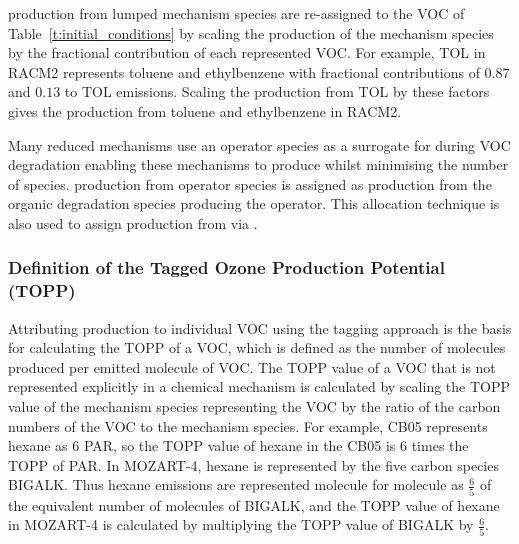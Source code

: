  production from lumped mechanism species are re-assigned to the VOC of \mbox{Table \ref{t:initial_conditions}} by scaling the  production of the mechanism species by the fractional contribution of each represented VOC.
For example, TOL in RACM2 represents toluene and ethylbenzene with fractional contributions of $0.87$ and $0.13$ to TOL emissions.
Scaling the  production from TOL by these factors gives the  production from toluene and ethylbenzene in RACM2.

Many reduced mechanisms use an operator species as a surrogate for  during VOC degradation enabling these mechanisms to produce  whilst minimising the number of  species.
 production from operator species is assigned as  production from the organic degradation species producing the operator.
This allocation technique is also used to assign  production from  via .
%
\subsubsection{Definition of the Tagged Ozone Production Potential (TOPP)} \label{sss:TOPP} %
%
Attributing  production to individual VOC using the tagging approach is the basis for calculating the TOPP of a VOC, which is defined as the number of  molecules produced per emitted molecule of VOC.
The TOPP value of a VOC that is not represented explicitly in a chemical mechanism is calculated by scaling the TOPP value of the mechanism species representing the VOC by the ratio of the carbon numbers of the VOC to the mechanism species.
For example, CB05 represents hexane as $6$ PAR, so the TOPP value of hexane in the CB05 is $6$ times the TOPP of PAR.
In MOZART-4, hexane is represented by the five carbon species BIGALK.
Thus hexane emissions are represented molecule for molecule as $\frac{6}{5}$ of the equivalent number of molecules of BIGALK, and the TOPP value of hexane in MOZART-4 is calculated by multiplying the TOPP value of BIGALK by $\frac{6}{5}$.
